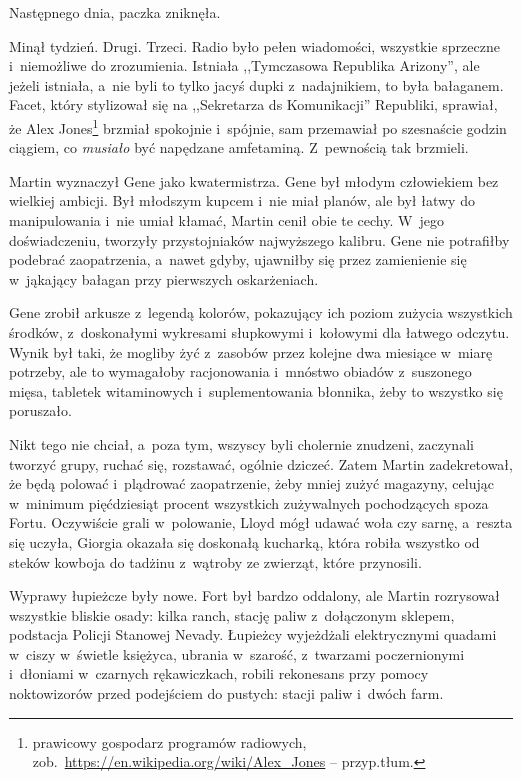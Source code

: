 \documentclass[oneside,polish,11pt,sfheadings]{mwbk}
\begin{document}
Następnego dnia, paczka zniknęła.

Minął tydzień. Drugi. Trzeci. Radio było pełen wiadomości, wszystkie
sprzeczne i~niemożliwe do zrozumienia. Istniała ,,Tymczasowa Republika
Arizony'', ale jeżeli istniała, a~nie byli to tylko jacyś dupki z~nadajnikiem, to była bałaganem. Facet, który stylizował się na
,,Sekretarza ds Komunikacji'' Republiki, sprawiał, że Alex Jones\footnote{
prawicowy gospodarz programów radiowych,
zob.~\url{https://en.wikipedia.org/wiki/Alex\_Jones} -- przyp.tłum.} brzmiał spokojnie i~spójnie, sam przemawiał po szesnaście
godzin ciągiem, co \textit{musiało} być napędzane amfetaminą. Z~pewnością
tak brzmieli.

Martin wyznaczył Gene jako kwatermistrza. Gene był młodym człowiekiem
bez wielkiej ambicji. Był młodszym kupcem i~nie miał planów, ale był
łatwy do manipulowania i~nie umiał kłamać, Martin cenił obie te cechy. W~jego doświadczeniu, tworzyły przystojniaków najwyższego kalibru. Gene
nie potrafiłby podebrać zaopatrzenia, a~nawet gdyby, ujawniłby się przez
zamienienie się w~jąkający bałagan przy pierwszych oskarżeniach.

Gene zrobił arkusze z~legendą kolorów, pokazujący ich poziom zużycia
wszystkich środków, z~doskonałymi wykresami słupkowymi i~kołowymi dla
łatwego odczytu. Wynik był taki, że mogliby żyć z~zasobów przez kolejne
dwa miesiące w~miarę potrzeby, ale to wymagałoby racjonowania i~mnóstwo
obiadów z~suszonego mięsa, tabletek witaminowych i~suplementowania
błonnika, żeby to wszystko się poruszało.

Nikt tego nie chciał, a~poza tym, wszyscy byli cholernie znudzeni,
zaczynali tworzyć grupy, ruchać się, rozstawać, ogólnie dziczeć. Zatem
Martin zadekretował, że będą polować i~plądrować zaopatrzenie, żeby
mniej zużyć magazyny, celując w~minimum pięćdziesiąt procent wszystkich
zużywalnych pochodzących spoza Fortu. Oczywiście grali w~polowanie,
Lloyd mógł udawać woła czy sarnę, a~reszta się uczyła, Giorgia okazała
się doskonałą kucharką, która robiła wszystko od steków kowboja do
tadżinu z~wątroby ze zwierząt, które przynosili.

Wyprawy łupieżcze były nowe. Fort był bardzo oddalony, ale Martin
rozrysował wszystkie bliskie osady: kilka ranch, stację paliw z~dołączonym sklepem, podstacja Policji Stanowej Nevady. Łupieżcy
wyjeżdżali elektrycznymi quadami w~ciszy w~świetle księżyca, ubrania w~szarość, z~twarzami poczernionymi i~dłoniami w~czarnych rękawiczkach,
robili rekonesans przy pomocy noktowizorów przed podejściem do pustych:
stacji paliw i~dwóch farm.
\end{document}
